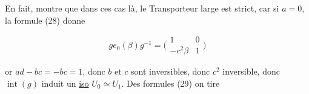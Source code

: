 
  En fait,     montre que dans ces cas là, le Transporteur large est strict, car si $a=0$, la formule (28) donne

\[
g e_0(\beta)g^{-1}=\bigl(\begin{smallmatrix}1&0\\-c^2\beta&1\end{smallmatrix}\bigr)\tag*{$(28')$}
\]

or $ad-bc=-bc=1$, donc $b$ et $c$ sont inversibles, donc $c^2$ inversible, donc $\operatorname{int}(g)$ induit un \uline{iso} $U_0\simeq U_1$. Des formules (29) on tire

